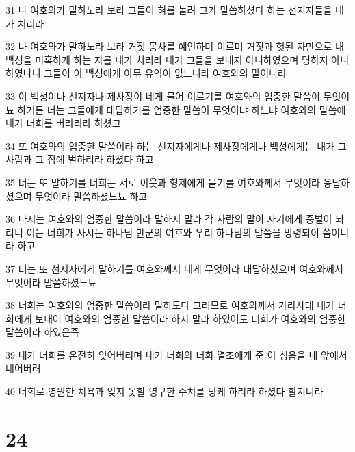 \par 31 나 여호와가 말하노라 보라 그들이 혀를 놀려 그가 말씀하셨다 하는 선지자들을 내가 치리라
\par 32 나 여호와가 말하노라 보라 거짓 몽사를 예언하며 이르며 거짓과 헛된 자만으로 내 백성을 미혹하게 하는 자를 내가 치리라 내가 그들을 보내지 아니하였으며 명하지 아니하였나니 그들이 이 백성에게 아무 유익이 없느니라 여호와의 말이니라
\par 33 이 백성이나 선지자나 제사장이 네게 물어 이르기를 여호와의 엄중한 말씀이 무엇이뇨 하거든 너는 그들에게 대답하기를 엄중한 말씀이 무엇이냐 하느냐 여호와의 말씀에 내가 너희를 버리리라 하셨고
\par 34 또 여호와의 엄중한 말씀이라 하는 선지자에게나 제사장에게나 백성에게는 내가 그사람과 그 집에 벌하리라 하셨다 하고
\par 35 너는 또 말하기를 너희는 서로 이웃과 형제에게 묻기를 여호와께서 무엇이라 응답하셨으며 무엇이라 말씀하셨느뇨 하고
\par 36 다시는 여호와의 엄중한 말씀이라 말하지 말라 각 사람의 말이 자기에게 중벌이 되리니 이는 너희가 사시는 하나님 만군의 여호와 우리 하나님의 말씀을 망령되이 씀이니라 하고
\par 37 너는 또 선지자에게 말하기를 여호와께서 네게 무엇이라 대답하셨으며 여호와께서 무엇이라 말씀하셨느뇨
\par 38 너희는 여호와의 엄중한 말씀이라 말하도다 그러므로 여호와께서 가라사대 내가 너희에게 보내어 여호와의 엄중한 말씀이라 하지 말라 하였어도 너희가 여호와의 엄중한 말씀이라 하였은즉
\par 39 내가 너희를 온전히 잊어버리며 내가 너희와 너희 열조에게 준 이 성읍을 내 앞에서 내어버려
\par 40 너희로 영원한 치욕과 잊지 못할 영구한 수치를 당케 하리라 하셨다 할지니라

\chapter{24}

